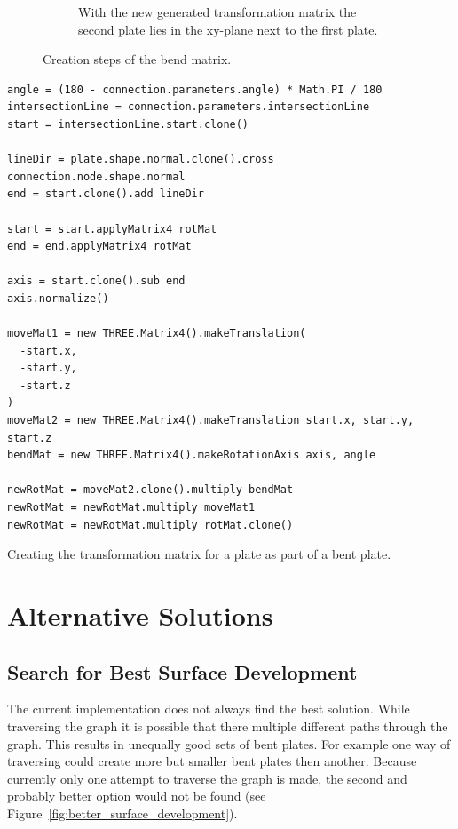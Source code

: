 \documentclass[../ClassicThesis.tex]{subfiles}
\begin{document}
\begin{figure}[h]
\begin{subfigure}[b]{0.49\textwidth}
    \caption{With the new generated transformation matrix the second plate lies in the xy-plane next to the first plate.}
    \label{fig:bend-matrix:6}
  \end{subfigure}
  \caption{Creation steps of the bend matrix.}
  \label{fig:bend-matrix}
\end{figure}

\begin{listing}[ht]
\begin{verbatim}
angle = (180 - connection.parameters.angle) * Math.PI / 180
intersectionLine = connection.parameters.intersectionLine
start = intersectionLine.start.clone()

lineDir = plate.shape.normal.clone().cross connection.node.shape.normal
end = start.clone().add lineDir

start = start.applyMatrix4 rotMat
end = end.applyMatrix4 rotMat

axis = start.clone().sub end
axis.normalize()

moveMat1 = new THREE.Matrix4().makeTranslation(
  -start.x,
  -start.y,
  -start.z
)
moveMat2 = new THREE.Matrix4().makeTranslation start.x, start.y, start.z
bendMat = new THREE.Matrix4().makeRotationAxis axis, angle

newRotMat = moveMat2.clone().multiply bendMat
newRotMat = newRotMat.multiply moveMat1
newRotMat = newRotMat.multiply rotMat.clone()
\end{verbatim}
\caption{Creating the transformation matrix for a plate as part of a bent plate.}
\label{lst:bend-matrix}
\end{listing}

\section{Alternative Solutions}

\subsection{Search for Best Surface Development}

The current implementation does not always find the best solution. While traversing the graph it is possible that there multiple different paths through the graph. This results in unequally good sets of bent plates. For example one way of traversing could create more but smaller bent plates then another.
Because currently only one attempt to traverse the graph is made, the second and probably better option would not be found (see Figure~\ref{fig:better_surface_development}).
\end{document}
